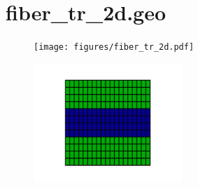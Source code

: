 \begin{figure}[!hht]
  \centering
\end{figure}

\newpage
\section{fiber_tr_2d.geo}

\begin{figure}[!hht]
  \centering
  \texttt{[image: figures/fiber\_tr\_2d.pdf]}
\end{figure}

\begin{figure}[!hht]
  \centering
  \includegraphics[width=0.5\textwidth]{figures/fiber_tr_2d_msh.pdf}
\end{figure}

